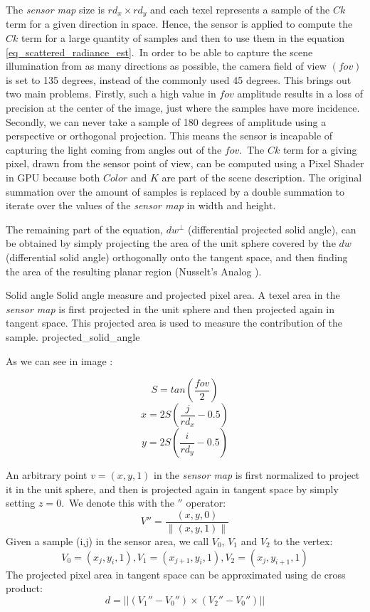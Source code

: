 \documentclass[10pt, conference]{IEEEtran}
\begin{document}
The \emph{sensor map} size is $rd_x \times rd_y$ and each texel represents a sample of the $Ck$ term for a given direction in space. Hence, the sensor is applied to compute the $Ck$ term for a large quantity of samples and then to use them in the equation \ref{eq_scattered_radiance_est}.\
In order to be able to capture the scene illumination from as many  directions as possible, the camera field of view $(fov)$ is set to 135 degrees, instead of the commonly used 45 degrees. This brings out two main problems. Firstly, such a high value in $fov$ amplitude results in a loss of precision at the center of the image, just where the samples have more incidence. Secondly, we can never take a sample of 180 degrees of amplitude using a perspective or orthogonal projection. This means the sensor is incapable of capturing the light coming from angles out of the $fov$.\
The $Ck$ term for a giving pixel, drawn from the sensor point of view, can be computed using a Pixel Shader in GPU because both $Color$ and $K$ are part of the scene description. The original summation over the amount of samples is replaced by a double summation to iterate over the values of the \emph{sensor map} in width and height.\

The remaining part of the equation, $dw^\perp$ (differential projected solid angle), can be obtained by simply projecting the area of the unit sphere 
covered by the $dw$ (differential solid angle) orthogonally onto the tangent space, and then finding the area of the resulting planar region (Nusselt's Analog \cite{perfect_diffuse_surfaces}).

\subimages
	{Solid angle Solid angle measure and projected pixel area. 
	A texel area in the \emph{sensor map} is first projected in the unit sphere and then projected again in tangent space. 
	This projected area is used to measure the contribution of the sample.}
	{projected_solid_angle}{
	\subimage[]{}{projected_solid_angle.png}%
}

As we can see in image :

\[ S = tan(\frac{fov}{2}) \]
\[ x = 2S(\frac{j}{rd_x} - 0.5) \]
\[ y = 2S(\frac{i}{rd_y} - 0.5) \]

An arbitrary point $v = (x,y,1)$ in the \emph{sensor map} is first normalized to project it in the unit sphere, and then is projected again in tangent space by simply setting $z = 0$.\
We denote this with the $''$ operator:\
\[ 
	V'' = \frac{(x, y, 0)} { \left\| (x,y,1) \right\| } 
\]
Given a sample (i,j) in the sensor area, we call $V_0$, $V_1$ and $V_2$ to the vertex:\
\[ 
	V_0 = (x_j, y_i, 1), V_1 = (x_{j+1}, y_i, 1), V_2 = (x_j, y_{i+1}, 1) 
\]
The projected pixel area in tangent space can be approximated using de cross product:\
\begin{equation}
	\label{eq_d}
	d = ||(V_1'' - V_0'') \times (V_2'' - V_0'')||
\end{equation}
\end{document}
